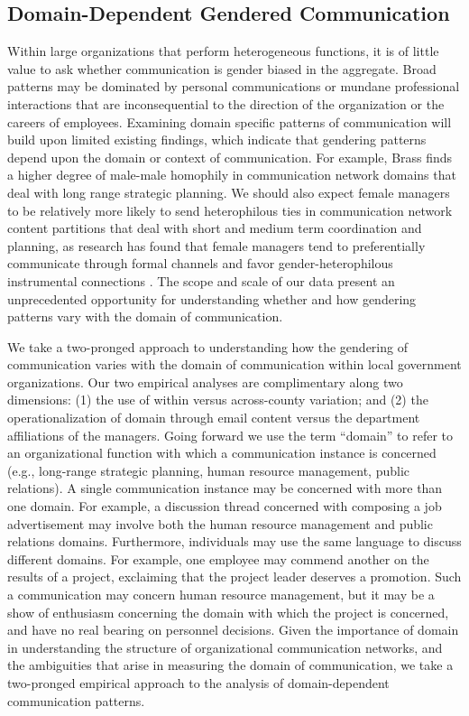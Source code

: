 \documentclass{pnastwo}
\begin{document}
\begin{article}
\subsection{Domain-Dependent Gendered Communication}
Within large organizations that perform heterogeneous functions, it is of little value to ask whether communication is gender biased in the aggregate. Broad patterns may be dominated by personal communications or mundane professional interactions that are inconsequential to the direction of the organization or the careers of employees. Examining domain specific patterns of communication will build upon limited existing findings, which indicate that gendering patterns depend upon the domain or context of communication. For example, Brass \citep{Brass1985} finds a higher degree of male-male homophily in communication network domains that deal with long range strategic planning. We should also expect female managers to be relatively more likely to send heterophilous ties in communication network content partitions that deal with short and medium term coordination and planning, as research has found that female managers tend to preferentially communicate through formal channels  \citep{Ragins1989} and favor gender-heterophilous instrumental connections \citep{Ibarra1992}. The scope and scale of our data present an unprecedented opportunity for understanding whether and how gendering patterns vary with the domain of communication.

We take a two-pronged approach to understanding how the gendering of communication varies with the domain of communication within local government organizations. Our two empirical analyses are complimentary along two dimensions: (1) the use of within versus across-county variation; and (2) the operationalization of domain through email content versus the department affiliations of the managers. Going forward we use the term ``domain'' to refer to an organizational function with which a communication instance is concerned (e.g., long-range strategic planning, human resource management, public relations). A single communication instance may be concerned with more than one domain. For example, a discussion thread concerned with composing a job advertisement may involve both the human resource management and public relations domains. Furthermore, individuals may use the same language to discuss different domains. For example, one employee may commend another on the results of a project, exclaiming that the project leader deserves a promotion. Such a communication may concern human resource management, but it may be a show of enthusiasm concerning the domain with which the project is concerned, and have no real bearing on personnel decisions. Given the importance of domain in understanding the structure of organizational communication networks, and the ambiguities that arise in measuring the domain of communication, we take a two-pronged empirical approach to the analysis of domain-dependent communication patterns.



\end{article}
\end{document}
